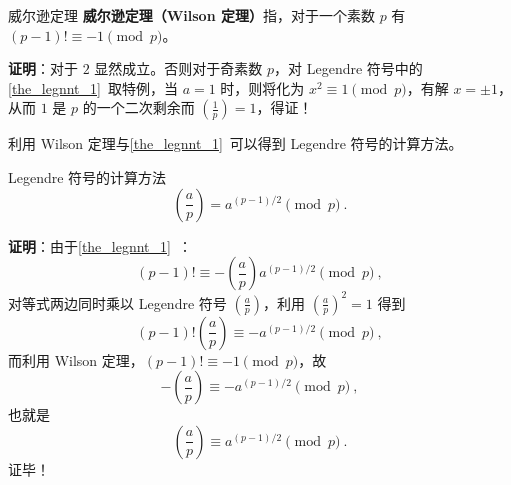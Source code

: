 
\begin{theorem}{威尔逊定理}
\textbf{威尔逊定理（Wilson 定理）}指，对于一个素数 $p$ 有 $(p-1)! \equiv -1 \pmod p$。
\end{theorem}
\textbf{证明}：对于 $2$ 显然成立。否则对于奇素数 $p$，对 Legendre 符号中的\autoref{the_legnnt_1}~取特例，当 $a=1$ 时，则将化为 $x^2 \equiv 1 \pmod p$，有解 $x = \pm 1$，从而 $1$ 是 $p$ 的一个二次剩余而 $\left(\frac 1p\right)=1$，得证！

利用 Wilson 定理与\autoref{the_legnnt_1}~可以得到 Legendre 符号的计算方法。
\begin{theorem}{Legendre 符号的计算方法}
\begin{equation}
\left(\frac ap\right) = a^{(p-1)/2} \pmod p ~.
\end{equation}
\end{theorem}
\textbf{证明}：由于\autoref{the_legnnt_1}~：
\begin{equation}
(p-1)! \equiv -\left(\frac ap\right) a^{(p-1)/2} \pmod p ~,
\end{equation}
对等式两边同时乘以 Legendre 符号 $\left(\frac ap\right)$，利用 $\left(\frac ap\right)^2 = 1$ 得到
\begin{equation}
(p-1)!\left(\frac ap\right) \equiv - a^{(p-1)/2} \pmod p ~,
\end{equation}
而利用 Wilson 定理，$(p-1)! \equiv -1 \pmod p$，故
\begin{equation}
-\left(\frac ap\right) \equiv - a^{(p-1)/2} \pmod p ~,
\end{equation}
也就是
\begin{equation}
\left(\frac ap\right) \equiv a^{(p-1)/2} \pmod p ~.
\end{equation}
证毕！
